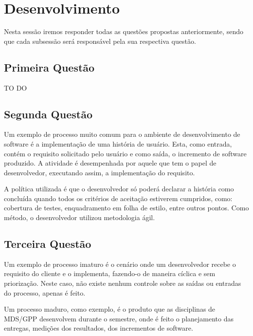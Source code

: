 \chapter[Desenvolvimento ]{Desenvolvimento}

Nesta sessão iremos responder todas as questões propostas anteriormente, sendo
que cada subsessão será responsável pela sua respectiva questão.

\section{Primeira Questão}
\label{sec:Primeira Questão}

TO DO

\section{Segunda Questão}
\label{sec:Segunda Questão}

Um exemplo de processo muito comum para o ambiente de desenvolvimento de software
é a implementação de uma história de usuário. Esta, como entrada, contém o
requisito solicitado pelo usuário e como saída, o incremento de software produzido.
A atividade é desempenhada por aquele que tem o papel de desenvolvedor, executando
assim, a implementação do requisito.

A política utilizada é que o desenvolvedor só poderá declarar a história como
concluída quando todos os critérios de aceitação estiverem cumpridos, como:
cobertura de testes, enquadramento em folha de estilo, entre outros pontos. Como
método, o desenvolvedor utilizou metodologia ágil.

\section{Terceira Questão}
\label{sec:Terceira Questão}

Um exemplo de processo imaturo é o cenário onde um desenvolvedor recebe o requisito
do cliente e o implementa, fazendo-o de maneira cíclica e sem priorização.
Neste caso, não existe nenhum controle sobre as saídas ou entradas do processo,
apenas é feito.

Um processo maduro, como exemplo, é o produto que as disciplinas de MDS/GPP
desenvolvem durante o semestre, onde é feito o planejamento das entregas, medições
dos resultados, dos incrementos de software.
